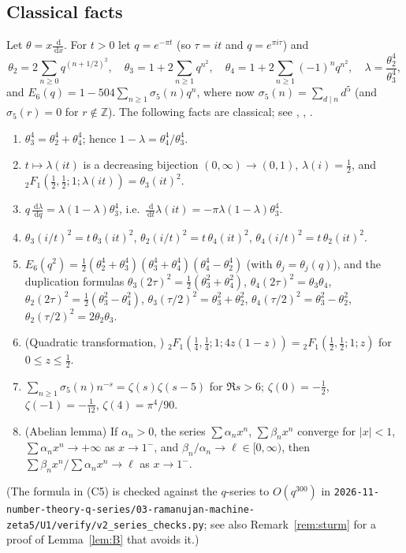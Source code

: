 \documentclass[11pt]{amsart}
\theoremstyle{definition}
\theoremstyle{remark}
\numberwithin{equation}{section}
\newcommand{\Z}{\mathbb{Z}}
\newcommand{\dd}{\,\mathrm{d}}
\newcommand{\file}[1]{\nolinkurl{2026-11-number-theory-q-series/03-ramanujan-machine-zeta5/#1}}
\begin{document}
\subsection{Classical facts}
Let $\theta=x\frac{\dd}{\dd x}$. For $t>0$ let $q=e^{-\pi t}$ (so $\tau=it$ and $q=e^{\pi i\tau}$) and
\[
\theta_2=2\sum_{n\ge0}q^{(n+1/2)^2},\quad \theta_3=1+2\sum_{n\ge1}q^{n^2},\quad\theta_4=1+2\sum_{n\ge1}(-1)^nq^{n^2},\quad \lambda=\frac{\theta_2^4}{\theta_3^4},
\]
and $E_6(q)=1-504\sum_{n\ge1}\sigma_5(n)q^n$, where now $\sigma_5(n)=\sum_{d\mid n}d^5$ (and $\sigma_5(r)=0$ for $r\notin\Z$). The following facts are classical; see \cite[ch.~21--22]{WW}, \cite[ch.~15, 20, 23]{DLMF}, \cite{Zag123}.
\begin{enumerate}[label=(C\arabic*)]
\item $\theta_3^4=\theta_2^4+\theta_4^4$; hence $1-\lambda=\theta_4^4/\theta_3^4$.
\item $t\mapsto\lambda(it)$ is a decreasing bijection $(0,\infty)\to(0,1)$, $\lambda(i)=\frac12$, and ${}_2F_1(\frac12,\frac12;1;\lambda(it))=\theta_3(it)^2$.
\item $q\,\frac{\dd\lambda}{\dd q}=\lambda(1-\lambda)\theta_3^4$, i.e.\ $\frac{\dd}{\dd t}\lambda(it)=-\pi\lambda(1-\lambda)\theta_3^4$.
\item $\theta_3(i/t)^2=t\,\theta_3(it)^2$, $\theta_2(i/t)^2=t\,\theta_4(it)^2$, $\theta_4(i/t)^2=t\,\theta_2(it)^2$.
\item $E_6(q^2)=\frac12(\theta_2^4+\theta_3^4)(\theta_3^4+\theta_4^4)(\theta_4^4-\theta_2^4)$ (with $\theta_j=\theta_j(q)$), and the duplication formulas $\theta_3(2\tau)^2=\frac12(\theta_3^2+\theta_4^2)$, $\theta_4(2\tau)^2=\theta_3\theta_4$, $\theta_2(2\tau)^2=\frac12(\theta_3^2-\theta_4^2)$, $\theta_3(\tau/2)^2=\theta_3^2+\theta_2^2$, $\theta_4(\tau/2)^2=\theta_3^2-\theta_2^2$, $\theta_2(\tau/2)^2=2\theta_2\theta_3$.
\item (Quadratic transformation, \cite[15.8.18]{DLMF}) ${}_2F_1(\frac14,\frac14;1;4z(1-z))={}_2F_1(\frac12,\frac12;1;z)$ for $0\le z\le\frac12$.
\item $\sum_{n\ge1}\sigma_5(n)n^{-s}=\zeta(s)\zeta(s-5)$ for $\Re s>6$; $\zeta(0)=-\frac12$, $\zeta(-1)=-\frac1{12}$, $\zeta(4)=\pi^4/90$.
\item (Abelian lemma) If $\alpha_n>0$, the series $\sum\alpha_nx^n$, $\sum\beta_nx^n$ converge for $|x|<1$, $\sum\alpha_nx^n\to+\infty$ as $x\to1^-$, and $\beta_n/\alpha_n\to\ell\in[0,\infty)$, then $\sum\beta_nx^n/\sum\alpha_nx^n\to\ell$ as $x\to1^-$.
\end{enumerate}
(The formula in (C5) is checked against the $q$-series to $O(q^{300})$ in \file{U1/verify/v2_series_checks.py}; see also Remark~\ref{rem:sturm} for a proof of Lemma~\ref{lem:B} that avoids it.)
\end{document}
